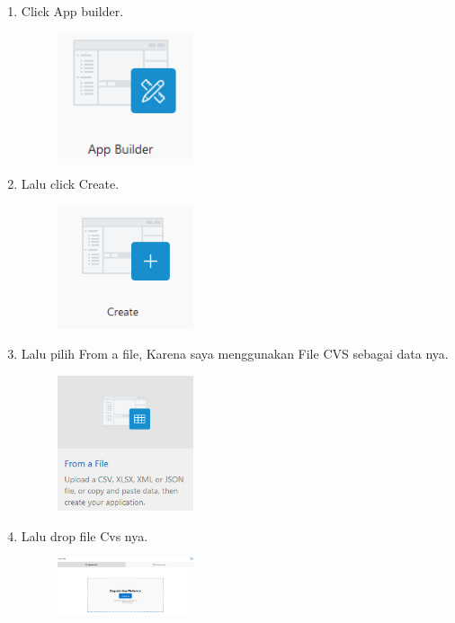\documentclass[a4paper,12pt]{report}
\begin{document}
\begin{enumerate}

\item
Click App builder.
\begin{figure}[h]
\includegraphics[width=4cm]{gambar/12.png}
\end{figure}

\item
Lalu click Create.
\begin{figure}[h]
\includegraphics[width=4cm]{gambar/13.png}
\end{figure} 

\newpage 
\item
Lalu pilih From a file, Karena saya menggunakan File CVS sebagai data nya.
\begin{figure}[h]
\includegraphics[width=4cm]{gambar/14.png}
\end{figure}

\item
Lalu drop file Cvs nya.
\begin{figure}[h]
\includegraphics[width=4cm]{gambar/15.png}
\end{figure} 


\end{enumerate}
\end{document}
